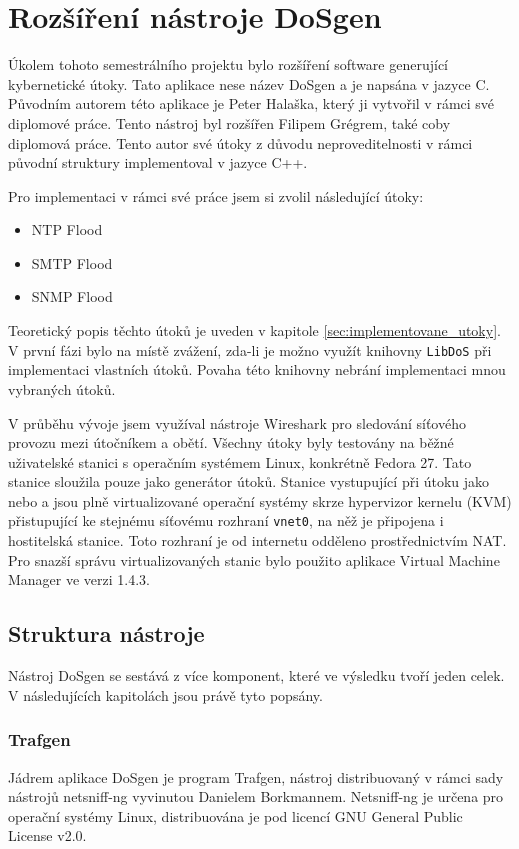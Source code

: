 \chapter{Rozšíření nástroje DoSgen}
Úkolem tohoto semestrálního projektu bylo rozšíření software generující kybernetické útoky. Tato aplikace nese název DoSgen a je napsána v jazyce C. Původním autorem této aplikace je Peter Halaška, který ji vytvořil v rámci své diplomové práce. Tento nástroj byl rozšířen Filipem Grégrem, také coby diplomová práce. Tento autor své útoky z důvodu neproveditelnosti v rámci původní struktury implementoval v jazyce C++.

Pro implementaci v rámci své práce jsem si zvolil následující útoky:
\begin{itemize}
	\item{NTP Flood}
	\item{SMTP Flood}
	\item{SNMP Flood}
\end{itemize}

Teoretický popis těchto útoků je uveden v kapitole \ref{sec:implementovane_utoky}. V první fázi bylo na místě zvážení, zda-li je možno využít knihovny \texttt{LibDoS} při implementaci vlastních útoků. Povaha této knihovny nebrání implementaci mnou vybraných útoků.

V průběhu vývoje jsem využíval nástroje Wireshark pro sledování síťového provozu mezi útočníkem a obětí. Všechny útoky byly testovány na běžné uživatelské stanici s operačním systémem Linux, konkrétně Fedora 27. Tato stanice sloužila pouze jako generátor útoků. Stanice vystupující při útoku jako  nebo  a  jsou plně virtualizované operační systémy skrze hypervizor kernelu (KVM) přistupující ke stejnému síťovému rozhraní \texttt{vnet0}, na něž je připojena i hostitelská stanice. Toto rozhraní je od internetu odděleno prostřednictvím NAT. Pro snazší správu virtualizovaných stanic bylo použito aplikace Virtual Machine Manager ve verzi 1.4.3.


\section{Struktura nástroje}
Nástroj DoSgen se sestává z více komponent, které ve výsledku tvoří jeden celek. V následujících kapitolách jsou právě tyto popsány.

\subsection{Trafgen}
Jádrem aplikace DoSgen je program Trafgen, nástroj distribuovaný v rámci sady nástrojů netsniff-ng vyvinutou Danielem Borkmannem. Netsniff-ng je určena pro operační systémy Linux, distribuována je pod licencí GNU General Public License v2.0.

